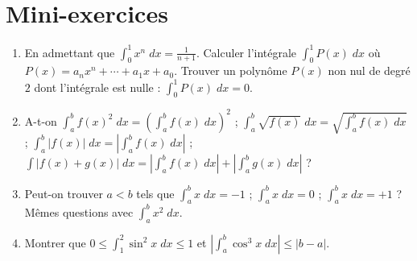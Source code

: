 \section*{Mini-exercices}


\begin{frame}
\begin{miniexercice}
\begin{enumerate}
  \item En admettant que $\int_0^1 x^n \; dx = \frac1{n+1}$. Calculer l'intégrale
$\int_0^1 P(x)\; dx$ où $P(x)=a_n x^n+\cdots+a_1x+a_0$. Trouver un polynôme $P(x)$ 
non nul de degré $2$ dont l'intégrale est nulle : $\int_0^1 P(x) \; dx=0$.

  \item A-t-on $\int_a^b f(x)^2 \; dx = \left( \int_a^b f(x) \; dx \right)^2$ ;
$\int_a^b \sqrt{f(x)} \; dx = \sqrt{\int_a^b f(x) \; dx}$ ;
$\int_a^b |f(x)| \; dx = \left| \int_a^b f(x) \; dx \right|$ ; 
$\int |f(x)+g(x)| \; dx = \left| \int_a^b f(x) \; dx \right| + \left| \int_a^b g(x) \; dx \right|$ ?

  \item Peut-on trouver $a<b$ tels que $\int_a^b x\; dx = -1$ ;
$\int_a^b x\; dx = 0$ ; $\int_a^b x\; dx = +1$ ?
Mêmes questions avec $\int_a^b x^2 \; dx$.

  \item Montrer que $0 \le \int_1^2  \sin^2 x \; dx \le 1$ et $\left|\int_a^b \cos^3 x \; dx \right| \le |b-a|$.
\end{enumerate}
\end{miniexercice}
\end{frame}


